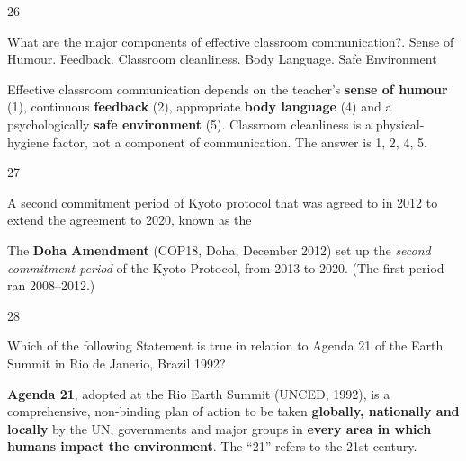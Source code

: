 \begin{question}{26}
{What are the major components of effective classroom communication?. Sense of Humour. Feedback. Classroom cleanliness. Body Language. Safe Environment\par}
\begin{explain}
Effective classroom communication depends on the teacher's \textbf{sense of humour} (1), continuous \textbf{feedback} (2), appropriate \textbf{body language} (4) and a psychologically \textbf{safe environment} (5). Classroom cleanliness is a physical-hygiene factor, not a component of communication. The answer is 1, 2, 4, 5.
\end{explain}
\end{question}

\begin{question}{27}
{A second commitment period of Kyoto protocol that was agreed to in 2012 to extend the agreement to 2020, known as the\par}
\begin{explain}
The \textbf{Doha Amendment} (COP18, Doha, December 2012) set up the \emph{second commitment period} of the Kyoto Protocol, from 2013 to 2020. (The first period ran 2008--2012.)
\end{explain}
\end{question}

\begin{question}{28}
{Which of the following Statement is true in relation to Agenda 21 of the Earth Summit in Rio de Janerio, Brazil 1992?\par}
\begin{explain}
\textbf{Agenda 21}, adopted at the Rio Earth Summit (UNCED, 1992), is a comprehensive, non-binding plan of action to be taken \textbf{globally, nationally and locally} by the UN, governments and major groups in \textbf{every area in which humans impact the environment}. The ``21'' refers to the 21st century.
\end{explain}
\end{question}

